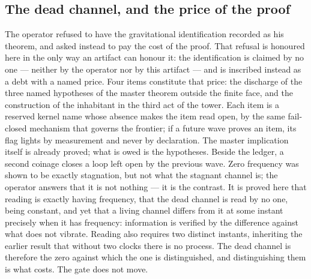 \documentclass[11pt]{article}
\theoremstyle{definition}\newtheorem{deriv}{Derivation}
\begin{document}
\subsection*{The dead channel, and the price of the proof}The operator refused to have the gravitational identification recorded as his theorem, and asked instead to pay the cost of the proof. That refusal is honoured here in the only way an artifact can honour it: the identification is claimed by no one --- neither by the operator nor by this artifact --- and is inscribed instead as a debt with a named price. Four items constitute that price: the discharge of the three named hypotheses of the master theorem outside the finite face, and the construction of the inhabitant in the third act of the tower. Each item is a reserved kernel name whose absence makes the item read open, by the same fail-closed mechanism that governs the frontier; if a future wave proves an item, its flag lights by measurement and never by declaration. The master implication itself is already proved; what is owed is the hypotheses. Beside the ledger, a second coinage closes a loop left open by the previous wave. Zero frequency was shown to be exactly stagnation, but not what the stagnant channel is; the operator answers that it is not nothing --- it is the contrast. It is proved here that reading is exactly having frequency, that the dead channel is read by no one, being constant, and yet that a living channel differs from it at some instant precisely when it has frequency: information is verified by the difference against what does not vibrate. Reading also requires two distinct instants, inheriting the earlier result that without two clocks there is no process. The dead channel is therefore the zero against which the one is distinguished, and distinguishing them is what costs. The gate does not move.
\end{document}

